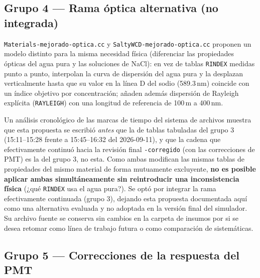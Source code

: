 \documentclass[11pt,a4paper]{article}
\newcommand{\codigo}[1]{\nolinkurl{#1}}
\begin{document}
\subsection{Grupo 4 --- Rama óptica alternativa (no integrada)}
\label{sec:grupo4}

\codigo{Materials-mejorado-optica.cc} y \codigo{SaltyWCD-mejorado-optica.cc}
proponen un modelo distinto para la misma necesidad física (diferenciar
las propiedades ópticas del agua pura y las soluciones de NaCl): en vez de
tablas \codigo{RINDEX} medidas punto a punto, interpolan la curva de
dispersión del agua pura y la desplazan verticalmente hasta que su valor
en la línea D del sodio (589.3\,nm) coincide con un índice objetivo por
concentración; añaden además dispersión de Rayleigh explícita
(\codigo{RAYLEIGH}) con una longitud de referencia de 100\,m a 400\,nm.

Un análisis cronológico de las marcas de tiempo del sistema de archivos
muestra que esta propuesta se escribió \emph{antes} que la de tablas
tabuladas del grupo 3 (15:11--15:28 frente a 15:45--16:32 del
2026-09-11), y que la cadena que efectivamente continuó hacia la revisión
final \codigo{-corregido} (con las correcciones de PMT) es la del grupo 3,
no esta. Como ambas modifican las mismas tablas de propiedades del mismo
material de forma mutuamente excluyente, \textbf{no es posible aplicar
ambas simultáneamente sin reintroducir una inconsistencia física}
(¿qué \codigo{RINDEX} usa el agua pura?). Se optó por integrar la rama
efectivamente continuada (grupo 3), dejando esta propuesta documentada
aquí como una alternativa evaluada y no adoptada en la versión final del
simulador. Su archivo fuente se conserva sin cambios en la carpeta de
insumos por si se desea retomar como línea de trabajo futura o como
comparación de sistemáticas.

\subsection{Grupo 5 --- Correcciones de la respuesta del PMT}
\end{document}
